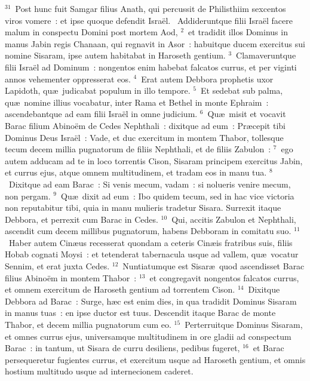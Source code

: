 ${}^{31}$~Post hunc fuit Samgar filius Anath, qui percussit de Philisthiim sexcentos viros vomere~: et ipse quoque defendit Isra\"el.
~Addideruntque filii Isra\"el facere malum in conspectu Domini post mortem Aod,
${}^{2}$~et tradidit illos Dominus in manus Jabin regis Chanaan, qui regnavit in Asor~: habuitque ducem exercitus sui nomine Sisaram, ipse autem habitabat in Haroseth gentium.
${}^{3}$~Clamaveruntque filii Isra\"el ad Dominum~: nongentos enim habebat falcatos currus, et per viginti annos vehementer oppresserat eos.
${}^{4}$~Erat autem Debbora prophetis uxor Lapidoth, qu\ae\ judicabat populum in illo tempore.
${}^{5}$~Et sedebat sub palma, qu\ae\ nomine illius vocabatur, inter Rama et Bethel in monte Ephraim~: ascendebantque ad eam filii Isra\"el in omne judicium.
${}^{6}$~Qu\ae\ misit et vocavit Barac filium Abino\"em de Cedes Nephthali~: dixitque ad eum~: Pr\ae cepit tibi Dominus Deus Isra\"el~: Vade, et duc exercitum in montem Thabor, tollesque tecum decem millia pugnatorum de filiis Nephthali, et de filiis Zabulon~:
${}^{7}$~ego autem adducam ad te in loco torrentis Cison, Sisaram principem exercitus Jabin, et currus ejus, atque omnem multitudinem, et tradam eos in manu tua.
${}^{8}$~Dixitque ad eam Barac~: Si venis mecum, vadam~: si nolueris venire mecum, non pergam.
${}^{9}$~Qu\ae\ dixit ad eum~: Ibo quidem tecum, sed in hac vice victoria non reputabitur tibi, quia in manu mulieris tradetur Sisara. Surrexit itaque Debbora, et perrexit cum Barac in Cedes.
${}^{10}$~Qui, accitis Zabulon et Nephthali, ascendit cum decem millibus pugnatorum, habens Debboram in comitatu suo.
${}^{11}$~Haber autem Cin\ae us recesserat quondam a ceteris Cin\ae is fratribus suis, filiis Hobab cognati Moysi~: et tetenderat tabernacula usque ad vallem, qu\ae\ vocatur Sennim, et erat juxta Cedes.
${}^{12}$~Nuntiatumque est Sisar\ae\ quod ascendisset Barac filius Abino\"em in montem Thabor~:
${}^{13}$~et congregavit nongentos falcatos currus, et omnem exercitum de Haroseth gentium ad torrentem Cison.
${}^{14}$~Dixitque Debbora ad Barac~: Surge, h\ae c est enim dies, in qua tradidit Dominus Sisaram in manus tuas~: en ipse ductor est tuus. Descendit itaque Barac de monte Thabor, et decem millia pugnatorum cum eo.
${}^{15}$~Perterruitque Dominus Sisaram, et omnes currus ejus, universamque multitudinem in ore gladii ad conspectum Barac~: in tantum, ut Sisara de curru desiliens, pedibus fugeret,
${}^{16}$~et Barac persequeretur fugientes currus, et exercitum usque ad Haroseth gentium, et omnis hostium multitudo usque ad internecionem caderet.


